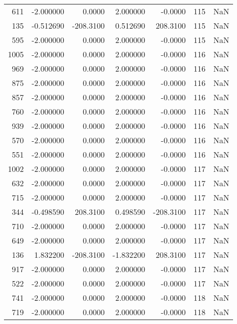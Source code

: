 \begin{tabular}{rrrrrrr}
 611 &   -2.000000 &    0.0000 &    2.000000 &     -0.0000 &         115 & NaN \\
 135 &   -0.512690 & -208.3100 &    0.512690 &    208.3100 &         115 & NaN \\
 595 &   -2.000000 &    0.0000 &    2.000000 &     -0.0000 &         115 & NaN \\
1005 &   -2.000000 &    0.0000 &    2.000000 &     -0.0000 &         116 & NaN \\
 969 &   -2.000000 &    0.0000 &    2.000000 &     -0.0000 &         116 & NaN \\
 875 &   -2.000000 &    0.0000 &    2.000000 &     -0.0000 &         116 & NaN \\
 857 &   -2.000000 &    0.0000 &    2.000000 &     -0.0000 &         116 & NaN \\
 760 &   -2.000000 &    0.0000 &    2.000000 &     -0.0000 &         116 & NaN \\
 939 &   -2.000000 &    0.0000 &    2.000000 &     -0.0000 &         116 & NaN \\
 570 &   -2.000000 &    0.0000 &    2.000000 &     -0.0000 &         116 & NaN \\
 551 &   -2.000000 &    0.0000 &    2.000000 &     -0.0000 &         116 & NaN \\
1002 &   -2.000000 &    0.0000 &    2.000000 &     -0.0000 &         117 & NaN \\
 632 &   -2.000000 &    0.0000 &    2.000000 &     -0.0000 &         117 & NaN \\
 715 &   -2.000000 &    0.0000 &    2.000000 &     -0.0000 &         117 & NaN \\
 344 &   -0.498590 &  208.3100 &    0.498590 &   -208.3100 &         117 & NaN \\
 710 &   -2.000000 &    0.0000 &    2.000000 &     -0.0000 &         117 & NaN \\
 649 &   -2.000000 &    0.0000 &    2.000000 &     -0.0000 &         117 & NaN \\
 136 &    1.832200 & -208.3100 &   -1.832200 &    208.3100 &         117 & NaN \\
 917 &   -2.000000 &    0.0000 &    2.000000 &     -0.0000 &         117 & NaN \\
 522 &   -2.000000 &    0.0000 &    2.000000 &     -0.0000 &         117 & NaN \\
 741 &   -2.000000 &    0.0000 &    2.000000 &     -0.0000 &         118 & NaN \\
 719 &   -2.000000 &    0.0000 &    2.000000 &     -0.0000 &         118 & NaN \\

\end{tabular}
